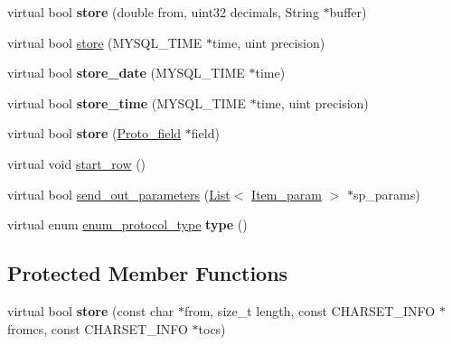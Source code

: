 \begin{DoxyCompactItemize}
\item 
\mbox{\label{classProtocol__text_ad65baef53e9be3fe7d9161c1703208aa}} 
virtual bool {\bfseries store} (double from, uint32 decimals, String $\ast$buffer)
\item 
virtual bool \mbox{\hyperlink{classProtocol__text_a66166244c73b0d710d2896c411514890}{store}} (M\+Y\+S\+Q\+L\+\_\+\+T\+I\+ME $\ast$time, uint precision)
\item 
\mbox{\label{classProtocol__text_aa34e65edb6fe90486493919ce62de3f7}} 
virtual bool {\bfseries store\+\_\+date} (M\+Y\+S\+Q\+L\+\_\+\+T\+I\+ME $\ast$time)
\item 
\mbox{\label{classProtocol__text_a889d1a9322cd3722cb3ebfd7da09e6d3}} 
virtual bool {\bfseries store\+\_\+time} (M\+Y\+S\+Q\+L\+\_\+\+T\+I\+ME $\ast$time, uint precision)
\item 
\mbox{\label{classProtocol__text_a43a748314d625cd61b1d8d792eeabf49}} 
virtual bool {\bfseries store} (\mbox{\hyperlink{classProto__field}{Proto\+\_\+field}} $\ast$field)
\item 
virtual void \mbox{\hyperlink{classProtocol__text_a72aad9182cd1313187654ba88712d54a}{start\+\_\+row}} ()
\item 
virtual bool \mbox{\hyperlink{classProtocol__text_ae0e360cdf482e877b4bd1e73b66db5d7}{send\+\_\+out\+\_\+parameters}} (\mbox{\hyperlink{classList}{List}}$<$ \mbox{\hyperlink{classItem__param}{Item\+\_\+param}} $>$ $\ast$sp\+\_\+params)
\item 
\mbox{\label{classProtocol__text_ad06ade69efef4726584fd3245bf069f1}} 
virtual enum \mbox{\hyperlink{classProtocol_ab1d147a8122f4ea4f8516ee23c514b02}{enum\+\_\+protocol\+\_\+type}} {\bfseries type} ()
\end{DoxyCompactItemize}
\subsection*{Protected Member Functions}
\begin{DoxyCompactItemize}
\item 
\mbox{\label{classProtocol__text_a4f111789d9134e22f9d23b8c84b20474}} 
virtual bool {\bfseries store} (const char $\ast$from, size\+\_\+t length, const C\+H\+A\+R\+S\+E\+T\+\_\+\+I\+N\+FO $\ast$fromcs, const C\+H\+A\+R\+S\+E\+T\+\_\+\+I\+N\+FO $\ast$tocs)
\end{DoxyCompactItemize}
